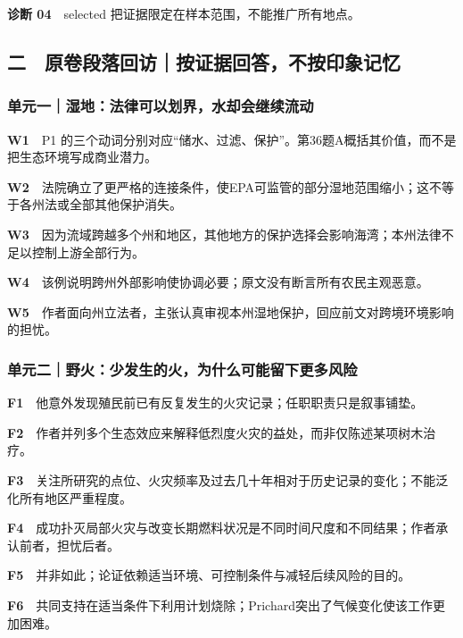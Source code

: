 \documentclass[
  11pt,
]{ctexart}
\begin{document}
\textbf{诊断 04}　selected 把证据限定在样本范围，不能推广所有地点。

\subsection{二　原卷段落回访｜按证据回答，不按印象记忆}\label{ux4e8c-ux539fux5377ux6bb5ux843dux56deux8bbfux6309ux8bc1ux636eux56deux7b54ux4e0dux6309ux5370ux8c61ux8bb0ux5fc6}

\subsubsection{单元一｜湿地：法律可以划界，水却会继续流动}\label{ux5355ux5143ux4e00ux6e7fux5730ux6cd5ux5f8bux53efux4ee5ux5212ux754cux6c34ux5374ux4f1aux7ee7ux7eedux6d41ux52a8-1}

\textbf{W1}　P1
的三个动词分别对应``储水、过滤、保护''。第36题A概括其价值，而不是把生态环境写成商业潜力。

\textbf{W2}　法院确立了更严格的连接条件，使EPA可监管的部分湿地范围缩小；这不等于各州法或全部其他保护消失。

\textbf{W3}　因为流域跨越多个州和地区，其他地方的保护选择会影响海湾；本州法律不足以控制上游全部行为。

\textbf{W4}　该例说明跨州外部影响使协调必要；原文没有断言所有农民主观恶意。

\textbf{W5}　作者面向州立法者，主张认真审视本州湿地保护，回应前文对跨境环境影响的担忧。

\subsubsection{单元二｜野火：少发生的火，为什么可能留下更多风险}\label{ux5355ux5143ux4e8cux91ceux706bux5c11ux53d1ux751fux7684ux706bux4e3aux4ec0ux4e48ux53efux80fdux7559ux4e0bux66f4ux591aux98ceux9669-1}

\textbf{F1}　他意外发现殖民前已有反复发生的火灾记录；任职职责只是叙事铺垫。

\textbf{F2}　作者并列多个生态效应来解释低烈度火灾的益处，而非仅陈述某项树木治疗。

\textbf{F3}　关注所研究的点位、火灾频率及过去几十年相对于历史记录的变化；不能泛化所有地区严重程度。

\textbf{F4}　成功扑灭局部火灾与改变长期燃料状况是不同时间尺度和不同结果；作者承认前者，担忧后者。

\textbf{F5}　并非如此；论证依赖适当环境、可控制条件与减轻后续风险的目的。

\textbf{F6}　共同支持在适当条件下利用计划烧除；Prichard突出了气候变化使该工作更加困难。
\end{document}
